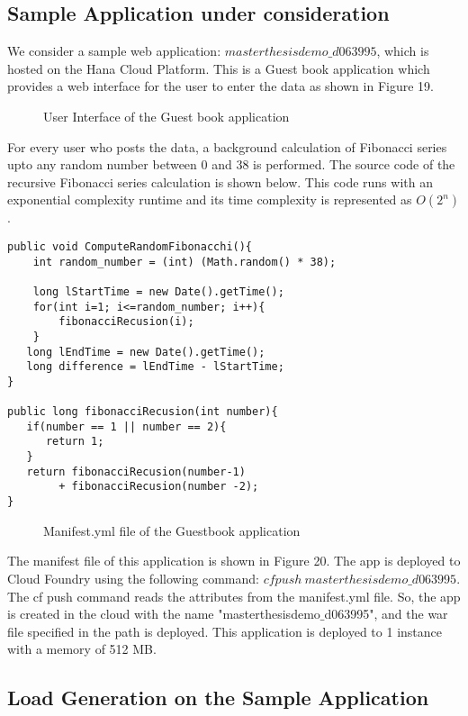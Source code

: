 \documentclass[article,type=msc,colorback,12pt,accentcolor=tud7b,table]{tudthesis}
\begin{document}
	\subsection{Sample Application under consideration}
We consider a sample web application: $masterthesisdemo\_d063995$, which is hosted on the Hana Cloud Platform. This is a Guest book application which provides a web interface for the user to enter the data as shown in Figure 19. 
 \begin{figure}[h]
 \begin{center}
  \makebox[\textwidth]{\texttt{[image: E1]}}
\end{center}
\caption{User Interface of the Guest book application}
\end{figure}
For every user who posts the data, a background calculation of Fibonacci series upto any random number between 0 and 38 is performed. The source code of the recursive Fibonacci series calculation is shown below. This code runs with an exponential complexity runtime and its time complexity is represented as $O(2^n)$.
 \begin{lstlisting}
public void ComputeRandomFibonacchi(){		
	int random_number = (int) (Math.random() * 38);		
		
	long lStartTime = new Date().getTime();
	for(int i=1; i<=random_number; i++){
		fibonacciRecusion(i);
    }			
   long lEndTime = new Date().getTime();
   long difference = lEndTime - lStartTime;    	
}
		  
public long fibonacciRecusion(int number){
   if(number == 1 || number == 2){
      return 1;
   }
   return fibonacciRecusion(number-1) 
   		+ fibonacciRecusion(number -2); 
}
\end{lstlisting}
 \begin{figure}[H]
 \begin{center}
  \makebox[\textwidth]{\texttt{[image: E2]}}
\end{center}
\caption{Manifest.yml file of the Guestbook application}
\end{figure}
The manifest file of this application is shown in Figure 20. The app is deployed to Cloud Foundry using the following command: $ cf push \: masterthesisdemo\_d063995 $. The cf push command reads the attributes from the manifest.yml file. So, the app is created in the cloud with the name "masterthesisdemo$\_$d063995", and the war file specified in the path is deployed. This application is deployed to 1 instance with a memory of 512 MB.	
	\subsection{Load Generation on the Sample Application}
	
\end{document}

